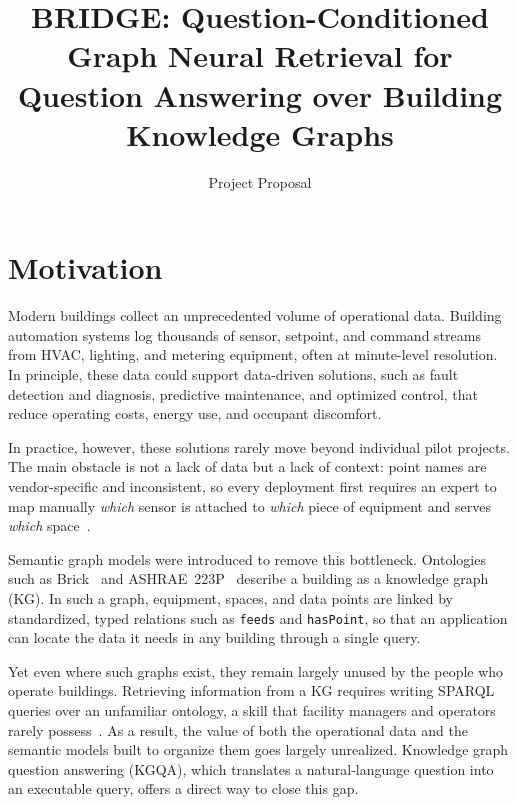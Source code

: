 \documentclass[11pt]{article}
\title{BRIDGE: Question-Conditioned Graph Neural Retrieval for\\Question Answering over Building Knowledge Graphs}
\author{Project Proposal}
\date{}
\newcommand{\code}[1]{\texttt{#1}}
\begin{document}
\maketitle
\vspace{-2em}

\section{Motivation}

Modern buildings collect an unprecedented volume of operational data. Building automation systems log thousands of sensor, setpoint, and command streams from HVAC, lighting, and metering equipment, often at minute-level resolution. In principle, these data could support data-driven solutions, such as fault detection and diagnosis, predictive maintenance, and optimized control, that reduce operating costs, energy use, and occupant discomfort.

In practice, however, these solutions rarely move beyond individual pilot projects. The main obstacle is not a lack of data but a lack of context: point names are vendor-specific and inconsistent, so every deployment first requires an expert to map manually \emph{which} sensor is attached to \emph{which} piece of equipment and serves \emph{which} space~\cite{pritoni2021metadata}.

Semantic graph models were introduced to remove this bottleneck. Ontologies such as Brick~\cite{balaji2016brick} and ASHRAE~223P~\cite{ashrae223p} describe a building as a knowledge graph (KG). In such a graph, equipment, spaces, and data points are linked by standardized, typed relations such as \code{feeds} and \code{hasPoint}, so that an application can locate the data it needs in any building through a single query.

Yet even where such graphs exist, they remain largely unused by the people who operate buildings. Retrieving information from a KG requires writing SPARQL queries over an unfamiliar ontology, a skill that facility managers and operators rarely possess~\cite{ko2026brickqa,mulayim2025buildingqa}. As a result, the value of both the operational data and the semantic models built to organize them goes largely unrealized. Knowledge graph question answering (KGQA), which translates a natural-language question into an executable query, offers a direct way to close this gap.
\end{document}
